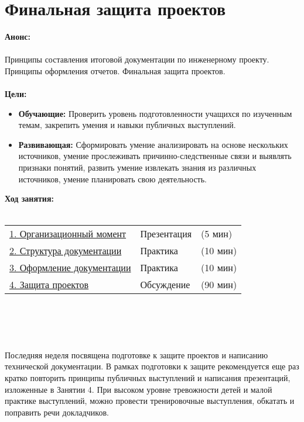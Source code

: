 \chapter{\label{lesson29}Финальная защита проектов}
{\bfseries Анонс:}\\\\
Принципы составления итоговой документации по инженерному проекту. Принципы оформления отчетов. Финальная защита проектов.\\\\
{\bfseries Цели:}
\begin{itemize}
	\item{}{\bfseries Обучающие:} Проверить уровень подготовленности учащихся по  изученным темам, закрепить умения и навыки публичных выступлений.   
	\item{}{\bfseries Развивающая:} Сформировать умение анализировать на основе нескольких источников, умение прослеживать причинно-следственные связи и выявлять признаки понятий,    развить умение извлекать знания из различных источников,    умение планировать свою деятельность.\\
\end{itemize}	
{\bfseries Ход занятия:}\\\\
\begin{tabular}[h!]{lll}
	{\hyperlink{lesson29x1}{1. Организационный момент}}&{Презентация}&{(5 мин)}\\
	{\hyperlink{lesson29x2}{2. Структура документации}}&{Практика}&{(10 мин)}\\
	{\hyperlink{lesson29x3}{3. Оформление документации}}&{Практика}&{(10 мин)}\\
	{\hyperlink{lesson29x4}{4. Защита проектов}}&{Обсуждение}&{(90 мин)}\\
\end{tabular}\\\\

{\hypertarget{lesson29x1}{}}\\\\

Последняя неделя посвящена подготовке к защите проектов и написанию технической документации. В рамках подготовки к защите рекомендуется еще раз кратко повторить принципы публичных выступлений и написания презентаций, изложенные в Занятии 4. При высоком уровне тревожности детей и малой практике выступлений, можно провести тренировочные выступления, обкатать и поправить речи докладчиков.

